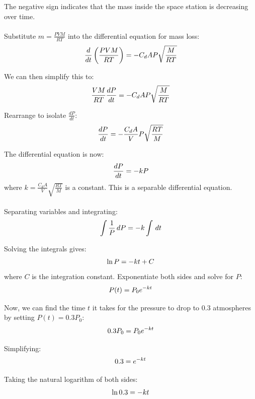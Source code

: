 The negative sign indicates that the mass inside the space station is decreasing over time.
\\\\
Substitute $m = \frac{PVM}{RT}$ into the differential equation for mass loss:
\begin{equation}
    \frac{d}{dt} \left(\frac{PVM}{RT}\right) = -C_d A P \sqrt{\frac{M}{RT}}
    \notag
\end{equation}

We can then simplify this to:
\begin{equation}\notag
    \frac{VM}{RT} \frac{dP}{dt} = -C_d A P \sqrt{\frac{M}{RT}}
\end{equation}

Rearrange to isolate $\frac{dP}{dt}$:
\begin{equation}\notag
    \frac{dP}{dt} = -\frac{C_d A}{V} P \sqrt{\frac{RT}{M}}
\end{equation}

The differential equation is now:
\begin{equation}\notag
    \frac{dP}{dt} = -kP
\end{equation}
where $k = \frac{C_d A}{V} \sqrt{\frac{RT}{M}}$ is a constant. This is a separable differential equation.
\\\\
Separating variables and integrating:
\begin{equation}\notag
    \int \frac{1}{P} \, dP = -k \int \, dt
\end{equation}

Solving the integrals gives:
\begin{equation}\notag
    \ln P = -kt + C
\end{equation}
where $C$ is the integration constant. Exponentiate both sides and solve for $P$:
\begin{equation}\notag
    P(t) = P_0 e^{-kt}
\end{equation}

Now, we can find the time $t$ it takes for the pressure to drop to 0.3 atmospheres by setting $P(t) = 0.3P_0$:
\begin{equation}\notag
    0.3P_0 = P_0 e^{-kt}
\end{equation}

Simplifying:
\begin{equation}\notag
    0.3 = e^{-kt}
\end{equation}

Taking the natural logarithm of both sides:
\begin{equation}\notag
    \ln 0.3 = -kt
\end{equation}

